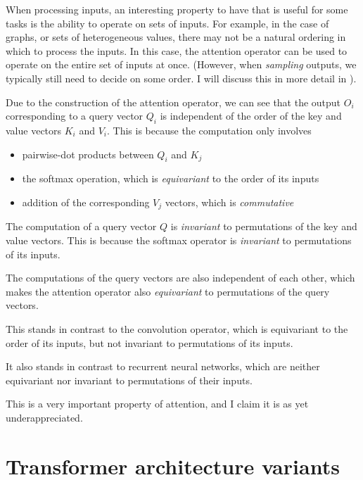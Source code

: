 When processing inputs, an interesting property to have that is useful for some tasks is the ability to operate on sets of inputs. For example, in the case of graphs, or sets of heterogeneous values, there may not be a natural ordering in which to process the inputs. In this case, the attention operator can be used to operate on the entire set of inputs at once. (However, when \textit{sampling} outputs, we typically still need to decide on some order. I will discuss this in more detail in ).

Due to the construction of the attention operator, we can see that the output $O_i$ corresponding to a query vector $Q_i$ is independent of the order of the key and value vectors $K_i$ and $V_i$. This is because the computation only involves
\begin{itemize}
    \item pairwise-dot products between $Q_i$ and $K_j$
    \item the softmax operation, which is \textit{equivariant} to the order of its inputs
    \item addition of the corresponding $V_j$ vectors, which is \textit{commutative}
\end{itemize}

The computation of a query vector $Q$ is \textit{invariant} to permutations of the key and value vectors. This is because the softmax operator is \textit{invariant} to permutations of its inputs.

The computations of the query vectors are also independent of each other, which makes the attention operator also \textit{equivariant} to permutations of the query vectors.

This stands in contrast to the convolution operator, which is equivariant to the order of its inputs, but not invariant to permutations of its inputs.

It also stands in contrast to recurrent neural networks, which are neither equivariant nor invariant to permutations of their inputs.

This is a very important property of attention, and I claim it is as yet underappreciated.



\section{Transformer architecture variants}

